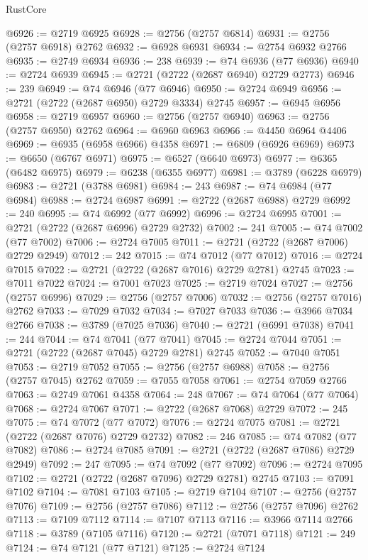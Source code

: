 \begin{lexlean}{RustCore}
\begin{coremodule}
@6926 := @2719 @6925
@6928 := @2756 (@2757 @6814)
@6931 := @2756 (@2757 @6918) @2762
@6932 := @6928 @6931
@6934 := @2754 @6932 @2766
@6935 := @2749 @6934
@6936 := 238
@6939 := @74 @6936 (@77 @6936)
@6940 := @2724 @6939
@6945 := @2721 (@2722 (@2687 @6940) @2729 @2773)
@6946 := 239
@6949 := @74 @6946 (@77 @6946)
@6950 := @2724 @6949
@6956 := @2721 (@2722 (@2687 @6950) @2729 @3334) @2745
@6957 := @6945 @6956
@6958 := @2719 @6957
@6960 := @2756 (@2757 @6940)
@6963 := @2756 (@2757 @6950) @2762
@6964 := @6960 @6963
@6966 := @4450 @6964 @4406
@6969 := @6935 (@6958 @6966) @4358
@6971 := @6809 (@6926 @6969)
@6973 := @6650 (@6767 @6971)
@6975 := @6527 (@6640 @6973)
@6977 := @6365 (@6482 @6975)
@6979 := @6238 (@6355 @6977)
@6981 := @3789 (@6228 @6979)
@6983 := @2721 (@3788 @6981)
@6984 := 243
@6987 := @74 @6984 (@77 @6984)
@6988 := @2724 @6987
@6991 := @2722 (@2687 @6988) @2729
@6992 := 240
@6995 := @74 @6992 (@77 @6992)
@6996 := @2724 @6995
@7001 := @2721 (@2722 (@2687 @6996) @2729 @2732)
@7002 := 241
@7005 := @74 @7002 (@77 @7002)
@7006 := @2724 @7005
@7011 := @2721 (@2722 (@2687 @7006) @2729 @2949)
@7012 := 242
@7015 := @74 @7012 (@77 @7012)
@7016 := @2724 @7015
@7022 := @2721 (@2722 (@2687 @7016) @2729 @2781) @2745
@7023 := @7011 @7022
@7024 := @7001 @7023
@7025 := @2719 @7024
@7027 := @2756 (@2757 @6996)
@7029 := @2756 (@2757 @7006)
@7032 := @2756 (@2757 @7016) @2762
@7033 := @7029 @7032
@7034 := @7027 @7033
@7036 := @3966 @7034 @2766
@7038 := @3789 (@7025 @7036)
@7040 := @2721 (@6991 @7038)
@7041 := 244
@7044 := @74 @7041 (@77 @7041)
@7045 := @2724 @7044
@7051 := @2721 (@2722 (@2687 @7045) @2729 @2781) @2745
@7052 := @7040 @7051
@7053 := @2719 @7052
@7055 := @2756 (@2757 @6988)
@7058 := @2756 (@2757 @7045) @2762
@7059 := @7055 @7058
@7061 := @2754 @7059 @2766
@7063 := @2749 @7061 @4358
@7064 := 248
@7067 := @74 @7064 (@77 @7064)
@7068 := @2724 @7067
@7071 := @2722 (@2687 @7068) @2729
@7072 := 245
@7075 := @74 @7072 (@77 @7072)
@7076 := @2724 @7075
@7081 := @2721 (@2722 (@2687 @7076) @2729 @2732)
@7082 := 246
@7085 := @74 @7082 (@77 @7082)
@7086 := @2724 @7085
@7091 := @2721 (@2722 (@2687 @7086) @2729 @2949)
@7092 := 247
@7095 := @74 @7092 (@77 @7092)
@7096 := @2724 @7095
@7102 := @2721 (@2722 (@2687 @7096) @2729 @2781) @2745
@7103 := @7091 @7102
@7104 := @7081 @7103
@7105 := @2719 @7104
@7107 := @2756 (@2757 @7076)
@7109 := @2756 (@2757 @7086)
@7112 := @2756 (@2757 @7096) @2762
@7113 := @7109 @7112
@7114 := @7107 @7113
@7116 := @3966 @7114 @2766
@7118 := @3789 (@7105 @7116)
@7120 := @2721 (@7071 @7118)
@7121 := 249
@7124 := @74 @7121 (@77 @7121)
@7125 := @2724 @7124

\end{coremodule}
\end{lexlean}
